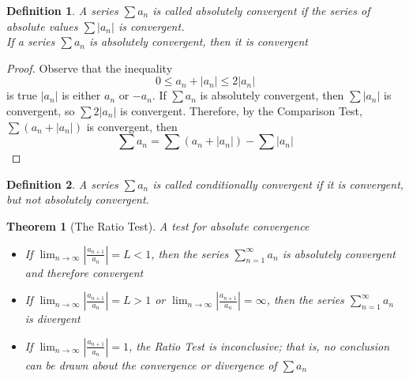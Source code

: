 \documentclass[10pt]{report}
\newtheorem{thm2}{Theorem}[section]
\newtheorem{def2}{Definition}[section]
\begin{document}
\begin{def2}
A series $\sum a_n$ is called absolutely convergent if the series of absolute values $\sum |a_n|$ is convergent.\\
If a series $\sum a_n$ is absolutely convergent, then it is convergent
\end{def2}
\begin{proof}
Observe that the inequality
$$0\leq a_n + |a_n| \leq 2|a_n|$$
is true $|a_n|$ is either $a_n$ or $-a_n$. If $\sum a_n$ is absolutely convergent, then $\sum |a_n|$ is convergent, so $\sum 2|a_n|$ is convergent. Therefore, by the Comparison Test, $\sum (a_n+|a_n|)$ is convergent, then
$$\sum a_n = \sum (a_n+|a_n|) - \sum |a_n|$$
\end{proof}
\begin{def2}
A series $\sum a_n$ is called conditionally convergent if it is convergent, but not absolutely convergent.
\end{def2}
\begin{thm2}[The Ratio Test]
A test for absolute convergence
\begin{itemize}
\item[(i)] If $\lim_{n\to\infty}\left| \frac{a_{n+1}}{a_n}\right| = L <1$, then the series $\sum_{n=1}^\infty a_n$ is absolutely convergent and therefore convergent
\item[(ii)] If $\lim_{n\to \infty} \left| \frac{a_{n+1}}{a_n}\right| = L > 1$ or $\lim_{n\to \infty} \left| \frac{a_{n+1}}{a_n}\right| = \infty$, then the series $\sum_{n=1}^\infty a_n$ is divergent
\item[(iii)] If $\lim_{n\to \infty} \left|\frac{a_{n+1}}{a_n}\right| = 1$, the Ratio Test is inconclusive; that is, no conclusion can be drawn about the convergence or divergence of $\sum a_n$
\end{itemize}
\end{thm2}
\end{document}
